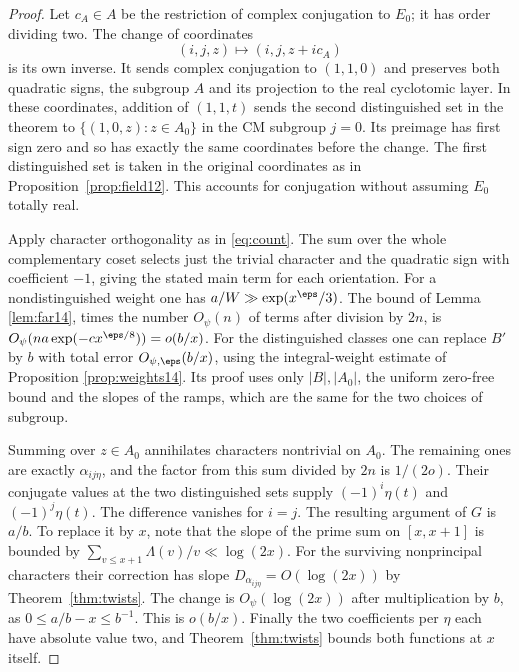 \documentclass[a4paper,11pt]{article}
\theoremstyle{definition}
\theoremstyle{remark}
\numberwithin{equation}{section}
\begin{document}
\begin{proof}
Let \(c_A\in A\) be the restriction of complex conjugation to \(E_0\);
it has order dividing two. The change of coordinates
\[
 (i,j,z)\longmapsto(i,j,z+i c_A)
\]
is its own inverse. It sends complex conjugation to \((1,1,0)\) and
preserves both quadratic signs, the subgroup \(A\) and its projection
to the real cyclotomic layer. In these coordinates, addition of
\((1,1,t)\) sends the second distinguished set in the theorem to
\(\{(1,0,z):z\in A_0\}\) in the CM subgroup \(j=0\). Its preimage has
first sign zero and so has exactly the same coordinates before the
change. The first distinguished set is taken in the original coordinates
as in Proposition~\ref{prop:field12}. This accounts for conjugation
without assuming \(E_0\) totally real.

Apply character orthogonality as in \eqref{eq:count}. The sum over the
whole complementary coset selects just the trivial character and the
quadratic sign with coefficient \(-1\), giving the stated main term for
each orientation. For a nondistinguished weight one has
\(a/W\gg\exp(x^\eps/3)\). The bound of Lemma \ref{lem:far14}, times
the number \(O_\psi(n)\) of terms after division by \(2n\), is
\(O_\psi(na \exp(-c x^{\eps/8}))=o(b/x)\).
For the distinguished classes one can replace \(B'\) by \(b\) with
total error \(O_{\psi,\eps}(b/x)\), using the integral-weight
estimate of Proposition \ref{prop:weights14}. Its proof uses only
\(|B|,|A_0|\), the uniform zero-free bound and the slopes of the ramps,
which are the same for the two choices of subgroup.

Summing over \(z\in A_0\) annihilates characters nontrivial on \(A_0\).
The remaining ones are exactly \(\alpha_{ij\eta}\), and the factor
from this sum divided by \(2n\) is \(1/(2o)\).
Their conjugate values at the two distinguished sets supply
\((-1)^i\eta(t)\) and \((-1)^j\eta(t)\). The difference vanishes for
\(i=j\). The resulting argument of \(G\) is \(a/b\).
To replace it by \(x\), note that the slope of the prime sum on
\([x,x+1]\) is bounded by \(\sum_{v\le x+1}\Lambda(v)/v\ll\log(2x)\).
For the surviving nonprincipal characters their correction has slope
\(D_{\alpha_{ij\eta}}=O(\log(2x))\) by Theorem~\ref{thm:twists}.
The change is \(O_\psi(\log(2x))\) after multiplication by \(b\),
as \(0\le a/b-x\le b^{-1}\). This is \(o(b/x)\). Finally the two
coefficients per \(\eta\) each have absolute value two, and
Theorem~\ref{thm:twists} bounds both functions at \(x\) itself.
\end{proof}
\end{document}
